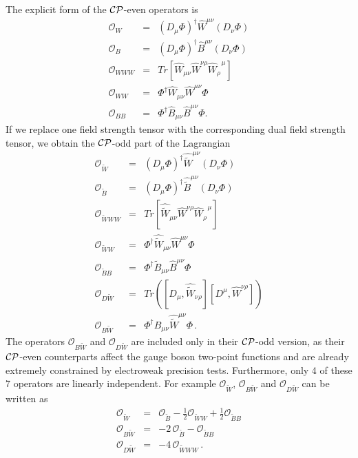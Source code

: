 \documentclass[english,12pt]{article}
\begin{document}
\vskip6pt
\noindent
The explicit form of the $\cal{CP}$-even operators is
\begin{eqnarray}
\mathcal{O}_{W} &=& (D_{\mu} \Phi)^{\dagger} \widehat{W}^{\mu \nu} (D_{\nu} \Phi) \nonumber \\
\mathcal{O}_{B} &=& (D_{\mu} \Phi)^{\dagger} \widehat{B}^{\mu \nu} (D_{\nu} \Phi) \nonumber \\
\mathcal{O}_{WWW} &=& Tr \left[ \widehat{W}_{\mu\nu} \widehat{W}^{\nu\rho} \widehat{W}_\rho^{\mbox{ } \mu} \right] \nonumber \\
\mathcal{O}_{WW} &=& \Phi^{\dagger} \widehat{W}_{\mu\nu} \widehat{W}^{\mu\nu} \Phi \nonumber \\
\mathcal{O}_{BB} &=& \Phi^{\dagger} \widehat{B}_{\mu\nu} \widehat{B}^{\mu\nu} \Phi .
\end{eqnarray}
If we replace one field strength tensor with the corresponding dual field strength tensor,
we obtain the $\cal{CP}$-odd part of the Lagrangian
\begin{eqnarray}
\mathcal{O}_{\widetilde{W}} &=& (D_{\mu} \Phi)^{\dagger} \widehat{\widetilde{W}}^{\mu \nu} (D_{\nu} \Phi) \nonumber \\
\mathcal{O}_{\widetilde{B}} &=& (D_{\mu} \Phi)^{\dagger} \widehat{\widetilde{B}}^{\mu \nu} (D_{\nu} \Phi) \nonumber \\
\mathcal{O}_{\widetilde{W}WW} &=& Tr \left[ \widehat{\widetilde{W}}_{\mu\nu} \widehat{W}^{\nu\rho} \widehat{W}_\rho^{\mbox{ } \mu} \right] \nonumber \\
\mathcal{O}_{\widetilde{W}W} &=& \Phi^{\dagger} \widehat{\widetilde{W}}_{\mu\nu} \widehat{W}^{\mu\nu} \Phi \nonumber \\
\mathcal{O}_{\widetilde{B}B} &=& \Phi^{\dagger} \widehat{\widetilde{B}}_{\mu\nu} \widehat{B}^{\mu\nu} \Phi \nonumber \\
\mathcal{O}_{D\widetilde{W}} &=& Tr \left( [D_\mu, \widehat{\widetilde{W}}_{\nu\rho} ] [D^\mu, \widehat{W}^{\nu\rho}] \right) \nonumber \\
\mathcal{O}_{B\widetilde{W}} &=& \Phi^{\dagger} \widehat{B}_{\mu\nu} \widehat{\widetilde{W}}^{\mu\nu} \Phi \, .
\end{eqnarray}
The operators $\mathcal{O}_{B\widetilde{W}}$ and $\mathcal{O}_{D\widetilde{W}}$
are included only in their $\cal{CP}$-odd version, as their $\cal{CP}$-even counterparts affect the gauge boson two-point functions and
are already extremely constrained by electroweak precision tests.
Furthermore, only 4 of these 7 operators are linearly independent. For example $\mathcal{O}_{\widetilde{W}}$, $\mathcal{O}_{B\widetilde{W}}$ 
and $\mathcal{O}_{D\widetilde{W}}$ can be written as
\begin{eqnarray}
\mathcal{O}_{\widetilde{W}} &=& \mathcal{O}_{\widetilde{B}} - \frac{1}{2} \mathcal{O}_{\widetilde{W}W} + \frac{1}{2} \mathcal{O}_{\widetilde{B}B}  \nonumber \\
\mathcal{O}_{B\widetilde{W}} &=& -2 \, \mathcal{O}_{\widetilde{B}} - \mathcal{O}_{\widetilde{B}B} \nonumber \\
\mathcal{O}_{D\widetilde{W}} &=& -4 \, \mathcal{O}_{\widetilde{W}WW} \, .
\end{eqnarray}
\end{document}

